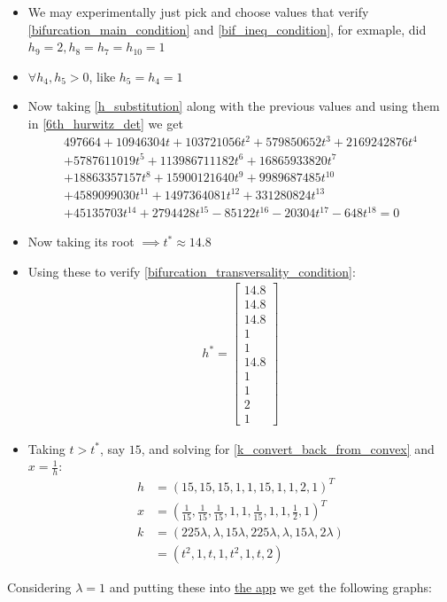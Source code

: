 \begin{itemize}
	\item {} We may experimentally just pick and choose values that verify	\ref{bifurcation_main_condition} and \ref{bif_ineq_condition}, for exmaple, \cite{conradi2024} did $ h_9 = 2, h_8 = h_7 = h_{ 10 } = 1$
	\item {} $\forall h_4, h_5 > 0$, like $h_5 = h_4 = 1$
	\item {} Now taking \ref{h_substitution} along with the previous values and using them in \ref{6th_hurwitz_det} we get
		\begin{gather*}
			497664+10946304t+103721056t^{2}+579850652t^{3}+2169242876t^{4} \\
			+5787611019t^{5}+113986711182t^{6}+16865933820t^{7} \\
			+18863357157t^{8}+15900121640t^{9}+9989687485t^{10} \\
			+4589099030t^{11}+1497364081t^{12}+331280824t^{13} \\
			+45135703t^{14}+2794428t^{15}-85122t^{16}-20304t^{17}-648t^{18}=0	
		\end{gather*}
	\item {} Now taking its root $\implies t^* \approx 14.8$
	\item {} Using these to verify \ref{bifurcation_transversality_condition}:
		\begin{align*}
			h^* =
			\begin{bmatrix}
				14.8 \\
				14.8 \\
				14.8 \\
				1 \\
				1 \\
				14.8 \\
				1 \\
				1 \\
				2 \\
				1
			\end{bmatrix}
		\end{align*}
	\item {} Taking $t > t^*$, say $15$, and solving for \ref{k_convert_back_from_convex} and $x = \frac{1}{h}$:
		\begin{align}
			h &= \left(15,15,15, 1,1,15,1,1,2,1\right)^T \\
			x &= \left( \frac{1}{15},\frac{1}{15},\frac{1}{15},1,1,\frac{1}{15},1,1,\frac{1}{2},1 \right)^T \\
			k &= \left( 225 \lambda, \lambda, 15\lambda, 225\lambda, \lambda, 15\lambda, 2\lambda  \right) \\
			&= (t^{2},1,t,1,t^{2},1,t,2)
		\end{align}
\end{itemize}
Considering $\lambda = 1$ and putting these into \href{https://github.com/viktorashi/Open-CoNtRol}{the app} we get the following graphs:

